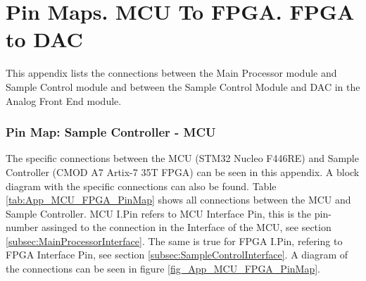 \chapter{Pin Maps. MCU To FPGA. FPGA to DAC} \label{App:PinMaps}

This appendix lists the connections between the Main Processor module and Sample Control module and between the Sample Control Module and DAC in the Analog Front End module.

\subsection{Pin Map: Sample Controller - MCU} \label{App:PinMap_MCU_FPGA}

The specific connections between the MCU (STM32 Nucleo F446RE) and Sample Controller (CMOD A7 Artix-7 35T FPGA) can be seen in this appendix. A block diagram with the specific
connections can also be found. Table \ref{tab:App_MCU_FPGA_PinMap} shows all connections between the MCU and Sample Controller. MCU I.Pin refers to MCU Interface Pin, this is the
pin-number assinged to the connection in the Interface of the MCU, see section \ref{subsec:MainProcessorInterface}. The same is true for FPGA I.Pin, refering to FPGA Interface Pin,
see section \ref{subsec:SampleControlInterface}. A diagram of the connections can be seen in figure \ref{fig_App_MCU_FPGA_PinMap}.

